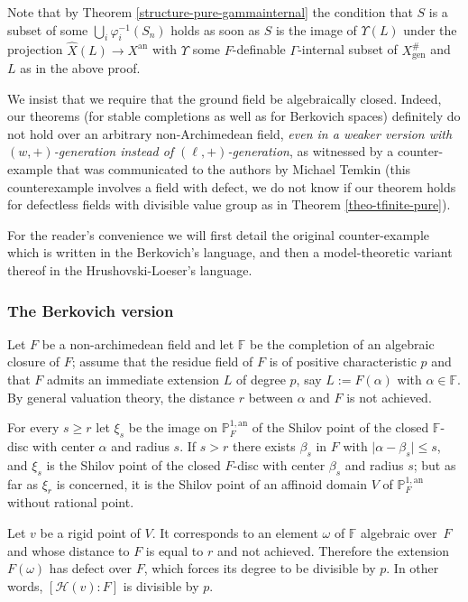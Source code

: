 \documentclass[JEP,XML,SOM,Unicode,ThmDefs,NoEqCountersInSection,published]{cedram}
\newcommand{\abs}[1]{\mathopen|#1\mathclose|}
\newcommand{\an}{^{\mathrm{an}}}
\renewcommand{\P}{\mathbb P}
\newcommand{\F}{\mathbb F}
\let\phi\varphi
\theoremstyle{plain}
\theoremstyle{definition}
\begin{document}
\begin{rema}Note that by Theorem
\ref{structure-pure-gammainternal}
the condition that $S$ is a subset of some
$\bigcup_i \phi_i^{-1}(S_n)$
holds as soon as $S$ is the image of $\Upsilon (L)$ under the projection $\widehat{X} (L) \to X\an$
with $\Upsilon$ some $F$-definable
$\Gamma$-internal subset of $X^{\#}_{\mathrm{gen}}$ and $L$ as in the above proof.
\end{rema}

\begin{rema}\label{contrex}
We insist that we require that the ground field
be algebraically closed. Indeed, our theorems (for stable completions
as well as for Berkovich spaces)
definitely
do not hold over an arbitrary non-Archimedean field,
\textit{even in a weaker version with $(w,+)$-generation
instead of $(\ell,+)$-generation}, as witnessed
by a counter-example that was communicated to the authors
by Michael Temkin (this counterexample involves a field with defect, we do not know if our theorem holds
for defectless fields with divisible value group as in Theorem \ref{theo-tfinite-pure}).

For the reader's convenience we will first detail
the original counter-example
which is written
in the Berkovich's language,
and then a model-theoretic variant
thereof in the
Hrushovski-Loeser's language.

\subsubsection{The Berkovich version}
Let $F$ be a non-archimedean field and let $\F$
be the completion of an algebraic closure of $F$; assume that
the residue field of $F$
is of positive characteristic $p$ and that
$F$ admits an immediate extension $L$ of degree $p$, say $L:=F(\alpha)$
with $\alpha\in \F$. By general valuation theory, the distance $r$ between $\alpha$ and $F$ is not achieved.

For every $s\geq r$ let $\xi_s$ be the image on
$\P^{1,\mathrm{an}}_F$ of the
Shilov point of the
closed $\F$-disc
with center $\alpha$ and radius $s$. If $s>r$ there exists $\beta_s$
in $F$ with $\abs{\alpha-\beta_s}\leq s$,
and $\xi_s$ is the Shilov point of the closed $F$-disc
with center $\beta_s$ and radius $s$; but as far as $\xi_r$ is concerned,
it is the Shilov point of an affinoid domain $V$ of $\P^{1,
\mathrm{an}}_F$ without rational point.

Let $v$ be a rigid point of $V$. It corresponds to an element $\omega$
of $\F$ algebraic over~$F$ and whose distance to $F$ is equal to $r$ and not achieved. Therefore the extension $F(\omega)$ has defect over $F$, which forces its degree to be divisible by $p$. In other words, $[\mathscr H(v):F]$ is divisible by $p$.


\end{rema}
\end{document}
